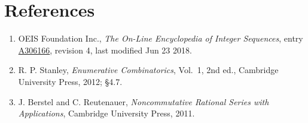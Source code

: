 \documentclass[11pt]{article}
\theoremstyle{definition}
\begin{document}
\section{References}

\begin{enumerate}

\item OEIS Foundation Inc., \emph{The On-Line Encyclopedia of Integer Sequences}, entry \href{https://oeis.org/A306166}{A306166}, revision 4, last modified Jun 23 2018.

\item R. P. Stanley, \emph{Enumerative Combinatorics}, Vol.~1, 2nd ed., Cambridge University Press, 2012; \S4.7.

\item J. Berstel and C. Reutenauer, \emph{Noncommutative Rational Series with Applications}, Cambridge University Press, 2011.

\end{enumerate}
\end{document}

